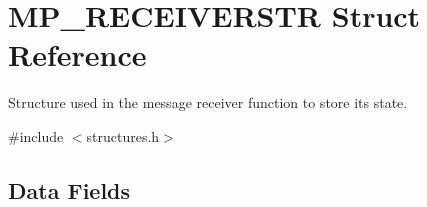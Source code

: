 \hypertarget{struct_m_p___r_e_c_e_i_v_e_r_s_t_r}{}\section{M\+P\+\_\+\+R\+E\+C\+E\+I\+V\+E\+R\+S\+TR Struct Reference}
\label{struct_m_p___r_e_c_e_i_v_e_r_s_t_r}


Structure used in the message receiver function to store it\textquotesingle{}s state.  




{\ttfamily \#include $<$structures.\+h$>$}

\subsection*{Data Fields}
